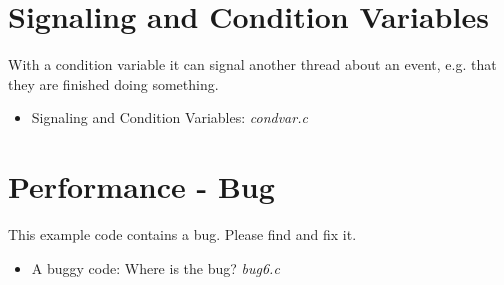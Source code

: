 \documentclass{article} \usepackage{listings}
\begin{document}
\section{Signaling and Condition Variables}
With a condition variable it can signal another thread about an event, e.g. that they are finished doing something.

\begin{itemize}

\item Signaling and Condition Variables: {\it condvar.c}


%


\end{itemize}

\section{Performance - Bug}

This example code contains a bug. Please find and fix it.

\begin{itemize}
\item A buggy code: Where is the bug? {\it bug6.c}



\end{itemize}
\end{document}

